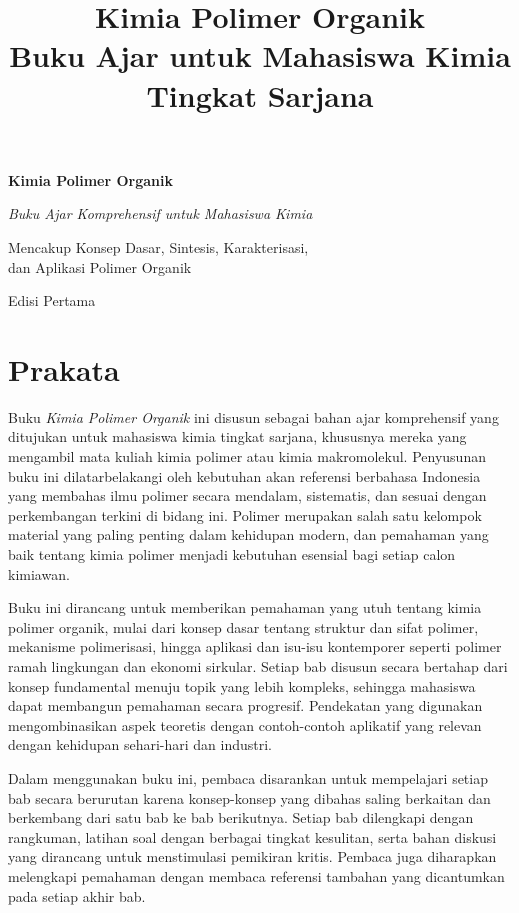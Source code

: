 \documentclass[12pt,a4paper,openany]{book}
\title{\textbf{Kimia Polimer Organik} \\[1cm]
  \Large Buku Ajar untuk Mahasiswa Kimia Tingkat Sarjana}
\author{}
\date{}
\begin{document}
\begin{titlepage}
\centering
\vspace*{2cm}
{\Huge\bfseries Kimia Polimer Organik\par}
\vspace{1.5cm}
{\Large\itshape Buku Ajar Komprehensif untuk Mahasiswa Kimia\par}
\vspace{1cm}
{\large Mencakup Konsep Dasar, Sintesis, Karakterisasi,\\dan Aplikasi Polimer Organik\par}
\vfill
{\large Edisi Pertama\par}
\vspace{1cm}
\end{titlepage}

\frontmatter
\tableofcontents
\newpage

\chapter*{Prakata}

Buku \textit{Kimia Polimer Organik} ini disusun sebagai bahan ajar komprehensif yang ditujukan untuk mahasiswa kimia tingkat sarjana, khususnya mereka yang mengambil mata kuliah kimia polimer atau kimia makromolekul. Penyusunan buku ini dilatarbelakangi oleh kebutuhan akan referensi berbahasa Indonesia yang membahas ilmu polimer secara mendalam, sistematis, dan sesuai dengan perkembangan terkini di bidang ini. Polimer merupakan salah satu kelompok material yang paling penting dalam kehidupan modern, dan pemahaman yang baik tentang kimia polimer menjadi kebutuhan esensial bagi setiap calon kimiawan.

Buku ini dirancang untuk memberikan pemahaman yang utuh tentang kimia polimer organik, mulai dari konsep dasar tentang struktur dan sifat polimer, mekanisme polimerisasi, hingga aplikasi dan isu-isu kontemporer seperti polimer ramah lingkungan dan ekonomi sirkular. Setiap bab disusun secara bertahap dari konsep fundamental menuju topik yang lebih kompleks, sehingga mahasiswa dapat membangun pemahaman secara progresif. Pendekatan yang digunakan mengombinasikan aspek teoretis dengan contoh-contoh aplikatif yang relevan dengan kehidupan sehari-hari dan industri.

Dalam menggunakan buku ini, pembaca disarankan untuk mempelajari setiap bab secara berurutan karena konsep-konsep yang dibahas saling berkaitan dan berkembang dari satu bab ke bab berikutnya. Setiap bab dilengkapi dengan rangkuman, latihan soal dengan berbagai tingkat kesulitan, serta bahan diskusi yang dirancang untuk menstimulasi pemikiran kritis. Pembaca juga diharapkan melengkapi pemahaman dengan membaca referensi tambahan yang dicantumkan pada setiap akhir bab.
\end{document}

